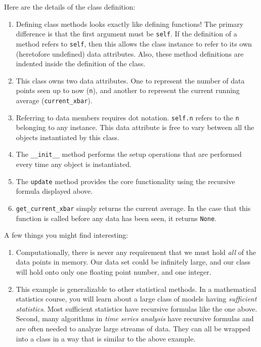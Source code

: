 \documentclass[
  12pt,
  krantz2]{krantz}
\begin{document}
Here are the details of the class definition:

\begin{enumerate}
\def\labelenumi{\arabic{enumi}.}
\item
  Defining class methods looks exactly like defining functions! The primary difference is that the first argument must be \texttt{self}. If the definition of a method refers to \texttt{self}, then this allows the class instance to refer to its own (heretofore undefined) data attributes. Also, these method definitions are indented inside the definition of the class.
\item
  This class owns two data attributes. One to represent the number of data points seen up to now (\texttt{n}), and another to represent the current running average (\texttt{current\_xbar}).
\item
  Referring to data members requires dot notation. \texttt{self.n} refers to the \texttt{n} belonging to any instance. This data attribute is free to vary between all the objects instantiated by this class.
\item
  The \texttt{\_\_init\_\_} method performs the setup operations that are performed every time any object is instantiated.
\item
  The \texttt{update} method provides the core functionality using the recursive formula displayed above.
\item
  \texttt{get\_current\_xbar} simply returns the current average. In the case that this function is called before any data has been seen, it returns \texttt{None}.
\end{enumerate}

A few things you might find interesting:

\begin{enumerate}
\def\labelenumi{\roman{enumi}.}
\item
  Computationally, there is never any requirement that we must hold \emph{all} of the data points in memory. Our data set could be infinitely large, and our class will hold onto only one floating point number, and one integer.
\item
  This example is generalizable to other statistical methods. In a mathematical statistics course, you will learn about a large class of models having \emph{sufficient statistics}. Most sufficient statistics have recursive formulas like the one above. Second, many algorithms in \emph{time series analysis} have recursive formulas and are often needed to analyze large streams of data. They can all be wrapped into a class in a way that is similar to the above example.
\end{enumerate}
\end{document}
